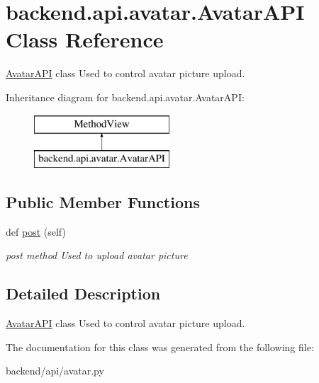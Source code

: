 \hypertarget{classbackend_1_1api_1_1avatar_1_1_avatar_a_p_i}{}\section{backend.\+api.\+avatar.\+Avatar\+A\+P\+I Class Reference}
\label{classbackend_1_1api_1_1avatar_1_1_avatar_a_p_i}


\hyperlink{classbackend_1_1api_1_1avatar_1_1_avatar_a_p_i}{Avatar\+A\+P\+I} class Used to control avatar picture upload.  


Inheritance diagram for backend.\+api.\+avatar.\+Avatar\+A\+P\+I\+:\begin{figure}[H]
\begin{center}
\leavevmode
\includegraphics[height=2.000000cm]{classbackend_1_1api_1_1avatar_1_1_avatar_a_p_i}
\end{center}
\end{figure}
\subsection*{Public Member Functions}
\begin{DoxyCompactItemize}
\item 
\hypertarget{classbackend_1_1api_1_1avatar_1_1_avatar_a_p_i_a7e7b1a90d77d99e06e273964fa6d3d40}{}def \hyperlink{classbackend_1_1api_1_1avatar_1_1_avatar_a_p_i_a7e7b1a90d77d99e06e273964fa6d3d40}{post} (self)\label{classbackend_1_1api_1_1avatar_1_1_avatar_a_p_i_a7e7b1a90d77d99e06e273964fa6d3d40}

\begin{DoxyCompactList}\small\item\em post method Used to upload avatar picture \end{DoxyCompactList}\end{DoxyCompactItemize}


\subsection{Detailed Description}
\hyperlink{classbackend_1_1api_1_1avatar_1_1_avatar_a_p_i}{Avatar\+A\+P\+I} class Used to control avatar picture upload. 

The documentation for this class was generated from the following file\+:\begin{DoxyCompactItemize}
\item 
backend/api/avatar.\+py\end{DoxyCompactItemize}
